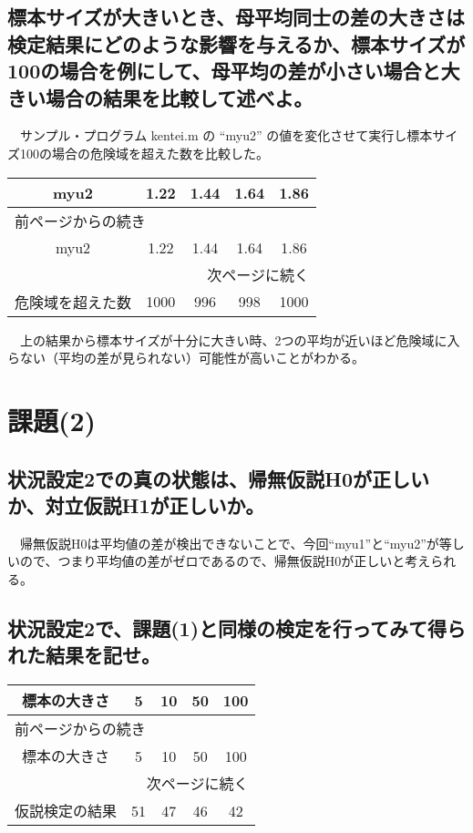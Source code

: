\documentclass{scrartcl}
\begin{document}
\subsection{標本サイズが大きいとき、母平均同士の差の大きさは検定結果にどのような影響を与えるか、標本サイズが100の場合を例にして、母平均の差が小さい場合と大きい場合の結果を比較して述べよ。}
\label{sec:org867db3a}
　サンプル・プログラム kentei.m の ``myu2'' の値を変化させて実行し標本サイズ100の場合の危険域を超えた数を比較した。\\
\begin{longtable}{|c|c|c|c|c|}
\hline
myu2 & 1.22 & 1.44 & 1.64 & 1.86\\
\hline
\endfirsthead
\multicolumn{5}{l}{前ページからの続き} \\
\hline

myu2 & 1.22 & 1.44 & 1.64 & 1.86 \\

\hline
\endhead
\hline\multicolumn{5}{r}{次ページに続く} \\
\endfoot
\endlastfoot
\hline
危険域を超えた数 & 1000 & 996 & 998 & 1000\\
\hline
\end{longtable}

　上の結果から標本サイズが十分に大きい時、2つの平均が近いほど危険域に入らない（平均の差が見られない）可能性が高いことがわかる。\\
\section{課題(2)}
\label{sec:org28be291}
\subsection{状況設定2での真の状態は、帰無仮説H0が正しいか、対立仮説H1が正しいか。}
\label{sec:org79b0465}
　帰無仮説H0は平均値の差が検出できないことで、今回``myu1''と``myu2''が等しいので、つまり平均値の差がゼロであるので、帰無仮説H0が正しいと考えられる。\\
\subsection{状況設定2で、課題(1)と同様の検定を行ってみて得られた結果を記せ。}
\label{sec:org3df39f3}
\begin{longtable}{|c|c|c|c|c|}
\hline
標本の大きさ & 5 & 10 & 50 & 100\\
\hline
\endfirsthead
\multicolumn{5}{l}{前ページからの続き} \\
\hline

標本の大きさ & 5 & 10 & 50 & 100 \\

\hline
\endhead
\hline\multicolumn{5}{r}{次ページに続く} \\
\endfoot
\endlastfoot
\hline
仮説検定の結果 & 51 & 47 & 46 & 42\\
\hline
\end{longtable}
\end{document}
